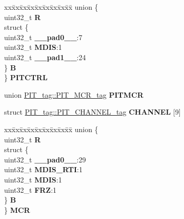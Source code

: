 \begin{DoxyCompactItemize}
\begin{tabbing}
\end{tabbing}\item 
\mbox{\label{structPIT__tag_a62b408ef33bb865252e1c4a216c0090c}} 
\begin{tabbing}
xx\=xx\=xx\=xx\=xx\=xx\=xx\=xx\=xx\=\kill
union \{\\
\>uint32\_t {\bfseries R}\\
\>struct \{\\
\>\>uint32\_t {\bfseries \_\_pad0\_\_}:7\\
\>\>uint32\_t {\bfseries MDIS}:1\\
\>\>uint32\_t {\bfseries \_\_pad1\_\_}:24\\
\>\} {\bfseries B}\\
\} {\bfseries PITCTRL}\\

\end{tabbing}\item 
\mbox{\label{structPIT__tag_a96020efad616a29d305bbc784a91a828}} 
union \mbox{\hyperlink{unionPIT__tag_1_1PIT__MCR__tag}{P\+I\+T\+\_\+tag\+::\+P\+I\+T\+\_\+\+M\+C\+R\+\_\+tag}} {\bfseries P\+I\+T\+M\+CR}
\item 
\mbox{\label{structPIT__tag_ad4fc4a7847fcbe20b263654c33f8aa1d}} 
struct \mbox{\hyperlink{structPIT__tag_1_1PIT__CHANNEL__tag}{P\+I\+T\+\_\+tag\+::\+P\+I\+T\+\_\+\+C\+H\+A\+N\+N\+E\+L\+\_\+tag}} {\bfseries C\+H\+A\+N\+N\+EL} \mbox{[}9\mbox{]}
\item 
\mbox{\label{structPIT__tag_a73388e0e1deb5ec364c7671a9ae737cb}} 
\begin{tabbing}
xx\=xx\=xx\=xx\=xx\=xx\=xx\=xx\=xx\=\kill
union \{\\
\>uint32\_t {\bfseries R}\\
\>struct \{\\
\>\>uint32\_t {\bfseries \_\_pad0\_\_}:29\\
\>\>uint32\_t {\bfseries MDIS\_RTI}:1\\
\>\>uint32\_t {\bfseries MDIS}:1\\
\>\>uint32\_t {\bfseries FRZ}:1\\
\>\} {\bfseries B}\\
\} {\bfseries MCR}\\


\end{tabbing}
\end{DoxyCompactItemize}
